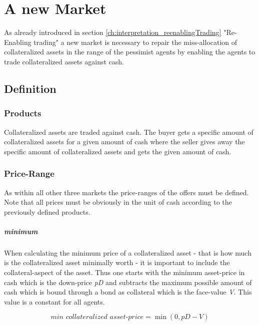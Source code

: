 \documentclass[Bachelorarbeit.tex]{subfiles}
\begin{document}
\graphicspath{{./figures/newMarket/}}	%

\chapter{A new Market}
\label{ch:newMarket}
As already introduced in section \ref{ch:interpretation_reenablingTrading} "Re-Enabling trading" a new market is necessary to repair the miss-allocation of collateralized assets in the range of the pessimist agents by enabling the agents to trade collateralized assets against cash.

\section{Definition}
\subsection{Products}
Collateralized assets are traded against cash. The buyer gets a specific amount of collateralized assets for a given amount of cash where the seller gives away the specific amount of collateralized assets and gets the given amount of cash.

\subsection{Price-Range}
As within all other three markets the price-ranges of the offers must be defined. Note that all prices must be obviously in the unit of cash according to the previously defined products.

\paragraph{minimum}
When calculating the minimum price of a collateralized asset - that is how much is the collateralized asset minimally worth - it is important to include the collateral-aspect of the asset. Thus one starts with the minimum asset-price in cash which is the down-price \textit{pD} and subtracts the maximum possible amount of cash which is bound through a bond as collateral which is the face-value \textit{V}. This value is a constant for all agents.

\begin{equation}
\textit{min collateralized asset-price} = \min(0, \textit{pD} - \textit{V})
\end{equation}
 
\end{document}
